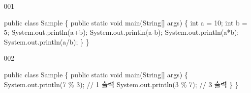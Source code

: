 001

public class Sample \{ public static void main(String{[}{]} args) \{ int
a = 10; int b = 5; System.out.println(a+b); System.out.println(a-b);
System.out.println(a*b); System.out.println(a/b); \} \}

002

public class Sample \{ public static void main(String{[}{]} args) \{
System.out.println(7 \% 3); // 1 출력 System.out.println(3 \% 7); // 3
출력 \} \}
